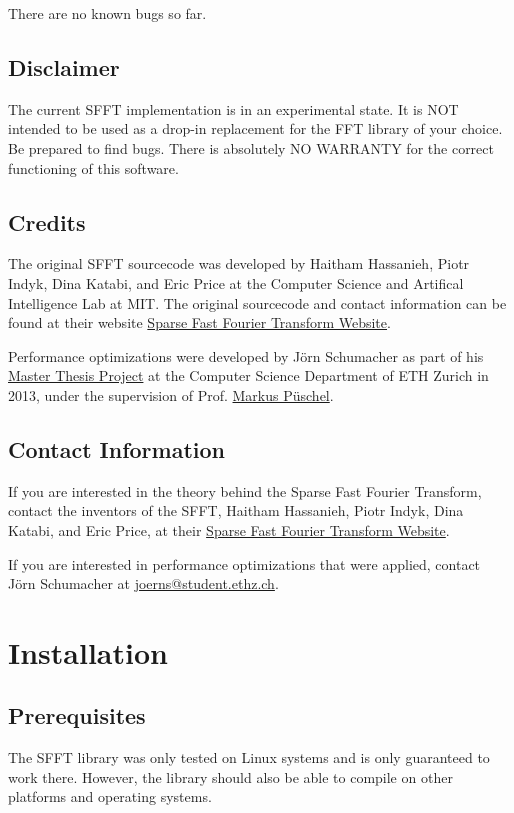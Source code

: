 \documentclass[letterpaper,10pt,english]{sphinxmanual}
\begin{document}
There are no known bugs so far.


\section{Disclaimer}
\label{introduction:disclaimer}
The current SFFT implementation is in an experimental state. It is NOT
intended to be used as a drop-in replacement for the FFT library of your choice.
Be prepared to find bugs. There is absolutely NO WARRANTY for the correct
functioning of this software.


\section{Credits}
\label{introduction:credits}
The original SFFT sourcecode was developed by Haitham Hassanieh, Piotr Indyk,
Dina Katabi, and Eric Price at the Computer Science and Artifical Intelligence
Lab at MIT. The original sourcecode and contact information can be found at
their website \href{http://groups.csail.mit.edu/netmit/sFFT/}{Sparse Fast Fourier Transform Website}.

Performance optimizations were developed by Jörn Schumacher
as part of his \href{http://www.spiral.net/software/sfft.html}{Master Thesis Project} at the
Computer Science Department of ETH Zurich in 2013, under the supervision of
Prof. \href{http://www.inf.ethz.ch/personal/markusp/}{Markus Püschel}.


\section{Contact Information}
\label{introduction:contact-information}
If you are interested in the theory behind the Sparse Fast Fourier Transform,
contact the inventors of the SFFT, Haitham Hassanieh, Piotr Indyk, Dina Katabi,
and Eric Price, at their \href{http://groups.csail.mit.edu/netmit/sFFT/}{Sparse Fast Fourier Transform Website}.

If you are interested in performance optimizations that were applied, contact
Jörn Schumacher at \href{mailto:joerns@student.ethz.ch}{joerns@student.ethz.ch}.


\chapter{Installation}
\label{installation::doc}\label{installation:markus-puschel}\label{installation:installation}

\section{Prerequisites}
\label{installation:prerequisites}
The SFFT library was only tested on Linux systems and is only guaranteed to
work there. However, the library should also be able to compile on other
platforms and operating systems.
\end{document}
